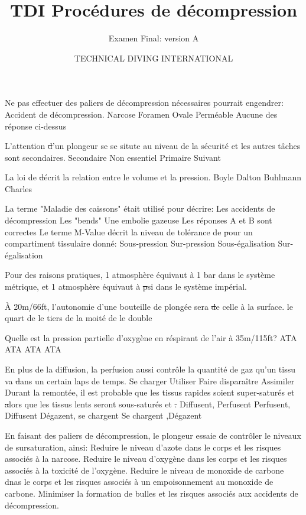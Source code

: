 \documentclass[english,10pt,twoside]{article}
\title{TDI Procédures de décompression}
\subtitle{Examen Final: version A}
\author{TECHNICAL DIVING INTERNATIONAL}
\begin{document}
\sloppy


	\begin{outline}
		\1 Ne pas effectuer des paliers de décompression nécessaires pourrait engendrer:
			\2 Accident de décompression.
			\2 Narcose
			\2 Foramen Ovale Perméable
			\2 Aucune des réponse ci-dessus

		\1 L'attention \st d'un plongeur se se situte au niveau de la sécurité et les autres tâches sont secondaires.
			\2 Secondaire
			\2 Non essentiel
			\2 Primaire
			\2 Suivant

		\1 La loi de \st décrit la relation entre le volume et la pression.
			\2 Boyle
			\2 Dalton
			\2 Buhlmann
			\2 Charles

		\1 La terme "Maladie des caissons" était utilisé pour décrire:
			\2 Les accidents de décompression
			\2 Les "bends"
			\2 Une embolie gazeuse
			\2 Les réponses A et B sont correctes
		\1 Le terme M-Value décrit la niveau de tolérance de \st pour un compartiment tissulaire donné:
			\2 Sous-pression
			\2 Sur-pression
			\2 Sous-égalisation
			\2 Sur-égalisation

		\1 Pour des raisons pratiques, 1 atmosphère équivaut à 1 bar dans le système métrique, et 1 atmosphère équivaut à \st psi dans le système impérial.

		\1 À 20m/66ft, l'autonomie d'une bouteille de plongée sera \st de celle à la surface.
			\2 le quart de
			\2 le tiers de
			\2 la moité de
			\2 le double

		\1 Quelle est la pression partielle d'oxygène en réspirant de l'air à 35m/115ft?
			 ATA
			 ATA
			 ATA
			 ATA

		\1 En plus de la diffusion, la perfusion aussi contrôle la quantité de gaz qu'un tissu va \st dans un certain laps de temps.
			\2 Se charger
			\2 Utiliser
			\2 Faire disparaître
			\2 Assimiler
		\1 Durant la remontée, il est probable que les tissus rapides soient super-saturés et \st alors que les tissus lents seront sous-saturés et \st.
			\2 Diffusent, Perfusent
			\2 Perfusent, Diffusent
			\2 Dégazent, se chargent
			\2 Se chargent ,Dégazent

		\1 En faisant des paliers de décompression, le plongeur essaie de contrôler le niveaux de sursaturation, ainsi:
			\2 Reduire le niveau d'azote dans le corps et les risques associés à la narcose.
			\2 Reduire le niveau d'oxygène dans les corps et les risques associés à la toxicité de l'oxygène.
			\2 Reduire le niveau de monoxide de carbone dnas le corps et les risques associés à un empoisonnement au monoxide de carbone.
			\2 Minimiser la formation de bulles et les risques associés aux accidents de décompression.


\end{outline}
\end{document}
